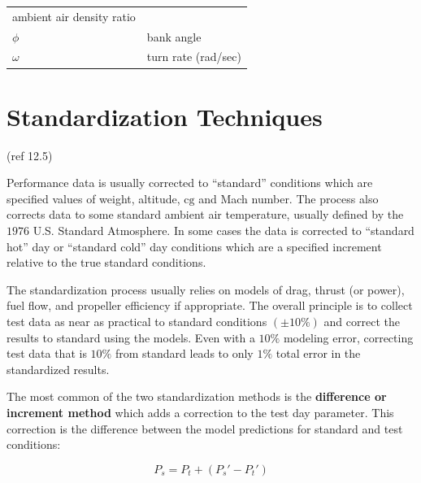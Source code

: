 \documentclass[
]{book}
\begin{document}
\begin{longtable}[]{@{}ll@{}}
\begin{minipage}[t]{0.80\columnwidth}
ambient air density ratio\strut
\end{minipage}\tabularnewline
\begin{minipage}[t]{0.14\columnwidth}\raggedright
\(\phi\)\strut
\end{minipage} & \begin{minipage}[t]{0.80\columnwidth}\raggedright
bank angle\strut
\end{minipage}\tabularnewline
\begin{minipage}[t]{0.14\columnwidth}\raggedright
\(\omega\)~\strut
\end{minipage} & \begin{minipage}[t]{0.80\columnwidth}\raggedright
turn rate (rad/sec)\strut
\end{minipage}\tabularnewline
\bottomrule
\end{longtable}

\hypertarget{standardization-techniques}{%
\section{Standardization Techniques}\label{standardization-techniques}}

(ref 12.5)

Performance data is usually corrected to ``standard'' conditions which are specified values of weight, altitude, \(\mathrm{cg}\) and Mach number.
The process also corrects data to some standard ambient air temperature, usually defined by the \(1976\) U.S. Standard Atmosphere.
In some cases the data is corrected to ``standard hot'' day or ``standard cold'' day conditions which are a specified increment relative to the true standard conditions.

The standardization process usually relies on models of drag, thrust (or power), fuel flow, and propeller efficiency if appropriate.
The overall principle is to collect test data as near as practical to standard conditions \(\left( \pm 10\% \right)\) and correct the results to standard using the models.
Even with a \(10\%\) modeling error, correcting test data that is \(10\%\) from standard leads to only \(1\%\) total error in the standardized results.

The most common of the two standardization methods is the \textbf{difference or increment method} which adds a correction to the test day parameter.
This correction is the difference between the model predictions for standard and test conditions:

\[
P_s = P_t + \left( P_s' - P_t' \right)
\label{eq:increment}
\]
\end{document}
